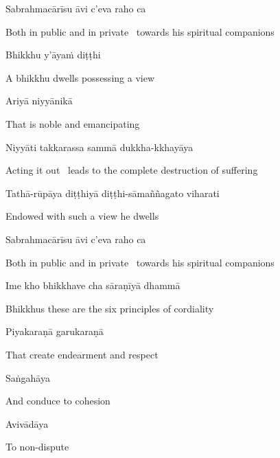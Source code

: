 Sabrahmacārīsu āvi c'eva raho ca

\begin{english}
  Both in public and in private \breathmark\ towards his spiritual companions
\end{english}

Bhikkhu y'āyaṁ diṭṭhi

\begin{english}
  A bhikkhu dwells possessing a view
\end{english}

Ariyā niyyānikā

\begin{english}
  That is noble and emancipating
\end{english}

Niyyāti takkarassa sammā dukkha-kkhayāya

\begin{english}
  Acting it out \breathmark\ leads to the complete destruction of suffering
\end{english}

Tathā-rūpāya diṭṭhiyā diṭṭhi-sāmaññagato viharati

\begin{english}
  Endowed with such a view he dwells
\end{english}

Sabrahmacārīsu āvi c'eva raho ca

\begin{english}
  Both in public and in private \breathmark\ towards his spiritual companions
\end{english}

Ime kho bhikkhave cha sāraṇīyā dhammā

\begin{english}
  Bhikkhus these are the six principles of cordiality
\end{english}

Piyakaraṇā garukaraṇā

\begin{english}
  That create endearment and respect
\end{english}

Saṅgahāya

\begin{english}
  And conduce to cohesion
\end{english}

Avivādāya

\begin{english}
  To non-dispute
\end{english}

